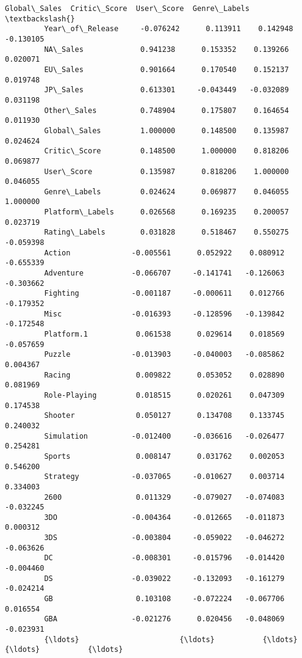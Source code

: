 \documentclass[11pt]{article}
\begin{document}
\begin{Verbatim}[commandchars=\\\{\}]
                          Global\_Sales  Critic\_Score  User\_Score  Genre\_Labels  \textbackslash{}
         Year\_of\_Release     -0.076242      0.113911    0.142948     -0.130105   
         NA\_Sales             0.941238      0.153352    0.139266      0.020071   
         EU\_Sales             0.901664      0.170540    0.152137      0.019748   
         JP\_Sales             0.613301     -0.043449   -0.032089      0.031198   
         Other\_Sales          0.748904      0.175807    0.164654      0.011930   
         Global\_Sales         1.000000      0.148500    0.135987      0.024624   
         Critic\_Score         0.148500      1.000000    0.818206      0.069877   
         User\_Score           0.135987      0.818206    1.000000      0.046055   
         Genre\_Labels         0.024624      0.069877    0.046055      1.000000   
         Platform\_Labels      0.026568      0.169235    0.200057      0.023719   
         Rating\_Labels        0.031828      0.518467    0.550275     -0.059398   
         Action              -0.005561      0.052922    0.080912     -0.655339   
         Adventure           -0.066707     -0.141741   -0.126063     -0.303662   
         Fighting            -0.001187     -0.000611    0.012766     -0.179352   
         Misc                -0.016393     -0.128596   -0.139842     -0.172548   
         Platform.1           0.061538      0.029614    0.018569     -0.057659   
         Puzzle              -0.013903     -0.040003   -0.085862      0.004367   
         Racing               0.009822      0.053052    0.028890      0.081969   
         Role-Playing         0.018515      0.020261    0.047309      0.174538   
         Shooter              0.050127      0.134708    0.133745      0.240032   
         Simulation          -0.012400     -0.036616   -0.026477      0.254281   
         Sports               0.008147      0.031762    0.002053      0.546200   
         Strategy            -0.037065     -0.010627    0.003714      0.334003   
         2600                 0.011329     -0.079027   -0.074083     -0.032245   
         3DO                 -0.004364     -0.012665   -0.011873      0.000312   
         3DS                 -0.003804     -0.059022   -0.046272     -0.063626   
         DC                  -0.008301     -0.015796   -0.014420     -0.004460   
         DS                  -0.039022     -0.132093   -0.161279     -0.024214   
         GB                   0.103108     -0.072224   -0.067706      0.016554   
         GBA                 -0.021276      0.020456   -0.048069     -0.023931   
         {\ldots}                       {\ldots}           {\ldots}         {\ldots}           {\ldots}   

\end{Verbatim}
\end{document}
